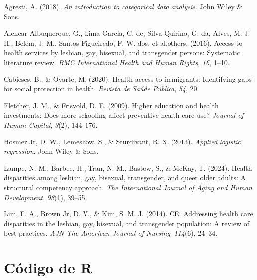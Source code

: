 \documentclass[
  12pt,
  a4paper,
]{article}
\newlength{\cslhangindent}
\newlength{\cslentryspacingunit} %
\newenvironment{CSLReferences}[2] %
 {%
  \setlength{\parindent}{0pt}
  \ifodd #1
  \let\oldpar\par
  \def\par{\hangindent=\cslhangindent\oldpar}
  \fi
  \setlength{\parskip}{#2\cslentryspacingunit}
 }%
 {}
\begin{document}
\hypertarget{refs}{}
\begin{CSLReferences}{1}{0}
\leavevmode{}%
Agresti, A. (2018). \emph{An introduction to categorical data analysis}. John Wiley \& Sons.

\leavevmode{}%
Alencar Albuquerque, G., Lima Garcia, C. de, Silva Quirino, G. da, Alves, M. J. H., Belém, J. M., Santos Figueiredo, F. W. dos, et al.others. (2016). Access to health services by lesbian, gay, bisexual, and transgender persons: Systematic literature review. \emph{BMC International Health and Human Rights}, \emph{16}, 1--10.

\leavevmode{}%
Cabieses, B., \& Oyarte, M. (2020). Health access to immigrants: Identifying gaps for social protection in health. \emph{Revista de Sa{ú}de P{ú}blica}, \emph{54}, 20.

\leavevmode{}%
Fletcher, J. M., \& Frisvold, D. E. (2009). Higher education and health investments: Does more schooling affect preventive health care use? \emph{Journal of Human Capital}, \emph{3}(2), 144--176.

\leavevmode{}%
Hosmer Jr, D. W., Lemeshow, S., \& Sturdivant, R. X. (2013). \emph{Applied logistic regression}. John Wiley \& Sons.

\leavevmode{}%
Lampe, N. M., Barbee, H., Tran, N. M., Bastow, S., \& McKay, T. (2024). Health disparities among lesbian, gay, bisexual, transgender, and queer older adults: A structural competency approach. \emph{The International Journal of Aging and Human Development}, \emph{98}(1), 39--55.

\leavevmode{}%
Lim, F. A., Brown Jr, D. V., \& Kim, S. M. J. (2014). CE: Addressing health care disparities in the lesbian, gay, bisexual, and transgender population: A review of best practices. \emph{AJN The American Journal of Nursing}, \emph{114}(6), 24--34.

\end{CSLReferences}

\pagebreak

\hypertarget{cuxf3digo-de-r}{%
\section{Código de R}\label{cuxf3digo-de-r}}
\end{document}
